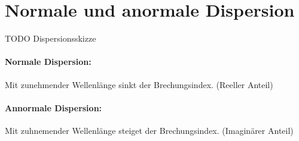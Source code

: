 
\section{Normale und anormale Dispersion}
\label{sec:dispersion}

TODO Dispersionsskizze

\paragraph*{Normale Dispersion: }
Mit zunehmender Wellenlänge sinkt der Brechungsindex. (Reeller Anteil)

\paragraph*{Annormale Dispersion: }
Mit zuhnemender Wellenlänge steiget der Brechungsindex. (Imaginärer Anteil)